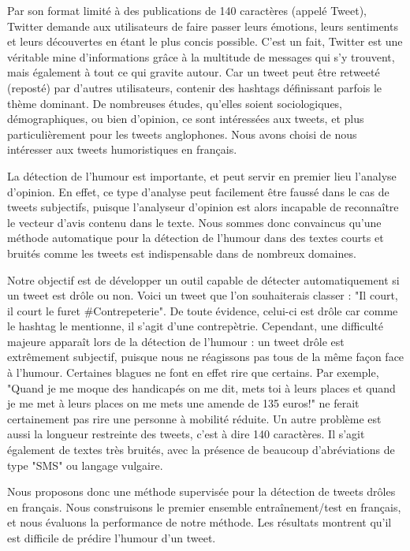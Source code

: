 \documentclass[10pt,a4paper,twoside]{article}
\begin{document}
Par son format limité à des publications de 140 caractères (appelé Tweet), Twitter demande aux utilisateurs de faire passer leurs émotions, leurs sentiments et leurs découvertes en étant le plus concis possible. C’est un fait, Twitter est une véritable mine d’informations grâce à la multitude de messages qui s'y trouvent, mais également à tout ce qui gravite autour. Car un tweet peut être retweeté (reposté) par d'autres utilisateurs, contenir des hashtags définissant parfois le thème dominant. De nombreuses études, qu'elles soient sociologiques, démographiques, ou bien d'opinion, ce sont intéressées aux tweets, et plus particulièrement pour les tweets anglophones. Nous avons choisi de nous intéresser aux tweets humoristiques en français.

La détection de l'humour est importante, et peut servir en premier lieu l'analyse d'opinion. En effet, ce type d'analyse peut facilement être faussé dans le cas de tweets subjectifs, puisque l'analyseur d'opinion est alors incapable de reconnaître le vecteur d'avis contenu dans le texte. Nous sommes donc convaincus qu'une méthode automatique pour la détection de l'humour dans des textes courts et bruités comme les tweets est indispensable dans de nombreux domaines. 

Notre objectif est de développer un outil capable de détecter automatiquement si un tweet est drôle ou non. Voici un tweet que l’on souhaiterais classer : "Il court, il court le furet \#Contrepeterie".  De toute évidence, celui-ci est drôle car comme le hashtag le mentionne, il s'agit d'une contrepètrie. Cependant, une difficulté majeure apparaît lors de la détection de l'humour : un tweet drôle est extrêmement subjectif, puisque nous ne réagissons pas tous de la même façon face à l'humour. Certaines blagues ne font en effet rire que certains. Par exemple, "Quand je me moque des handicapés on me dit, mets toi à leurs places et quand je me met à leurs places on me mets une amende de 135 euros!" ne ferait certainement pas rire une personne à mobilité réduite. Un autre problème est aussi la longueur restreinte des tweets, c'est à dire 140 caractères. Il s'agit également de textes très bruités, avec la présence de beaucoup d'abréviations de type "SMS" ou langage vulgaire.

Nous proposons donc une méthode supervisée pour la détection de tweets drôles en français. Nous construisons le premier ensemble entraînement/test en français, et nous évaluons la performance de notre méthode. Les résultats montrent qu'il est difficile de prédire l'humour d'un tweet.
\end{document}
